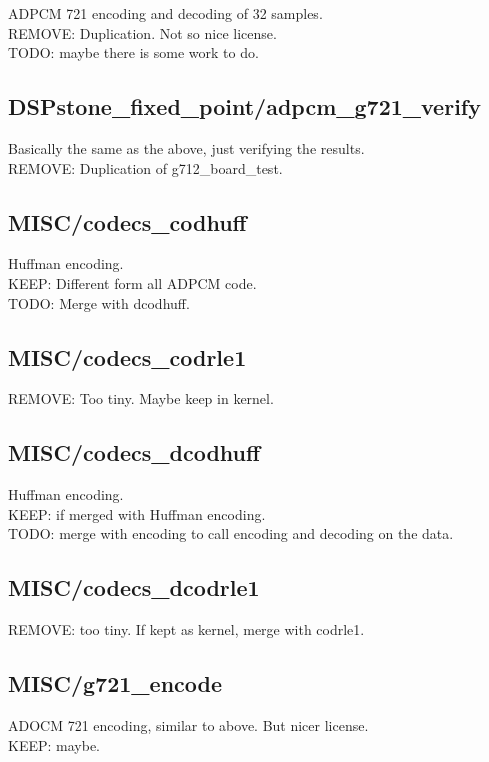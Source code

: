 \documentclass[a4paper]{article}
\begin{document}
ADPCM 721 encoding and decoding of 32 samples. \\
REMOVE: Duplication. Not so nice license. \\
TODO: maybe there is some work to do.

\subsection{DSPstone\_fixed\_point/adpcm\_g721\_verify}

Basically the same as the above, just verifying the results. \\
REMOVE: Duplication of g712\_board\_test.

\subsection{MISC/codecs\_codhuff}

Huffman encoding. \\
KEEP: Different form all ADPCM code. \\
TODO: Merge with dcodhuff.

\subsection{MISC/codecs\_codrle1}

REMOVE: Too tiny. Maybe keep in kernel.

\subsection{MISC/codecs\_dcodhuff}

Huffman encoding. \\
KEEP: if merged with Huffman encoding. \\
TODO: merge with encoding to call encoding and decoding on the data.

\subsection{MISC/codecs\_dcodrle1}

REMOVE: too tiny. If kept as kernel, merge with codrle1.

\subsection{MISC/g721\_encode}

ADOCM 721 encoding, similar to above. But nicer license. \\
KEEP: maybe.
\end{document}

